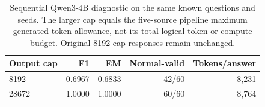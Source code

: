 \begin{table}[htbp]
\centering\small
\begin{tabular}{lrrrr}
\toprule
Output cap & F1 & EM & Normal-valid & Tokens/answer\\
\midrule
8192 & 0.6967 & 0.6833 & 42/60 & 8,231\\
28672 & 1.0000 & 1.0000 & 60/60 & 8,764\\
\bottomrule
\end{tabular}
\caption{Sequential Qwen3-4B diagnostic on the same known questions and seeds. The larger cap equals the five-source pipeline maximum generated-token allowance, not its total logical-token or compute budget. Original 8192-cap responses remain unchanged.}
\label{tab:budget-final}
\end{table}
